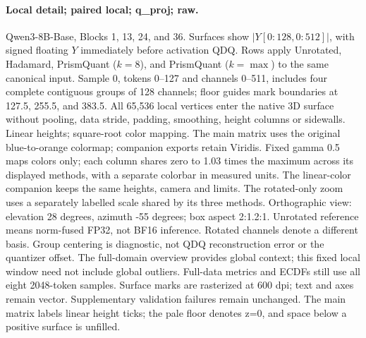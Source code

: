 \paragraph{Local detail; paired local; q\_proj; raw.} Qwen3-8B-Base, Blocks 1, 13, 24, and 36. Surfaces show $|Y[0:128,0:512]|$, with signed floating $Y$ immediately before activation QDQ. Rows apply Unrotated, Hadamard, PrismQuant ($k=8$), and PrismQuant ($k=\max$) to the same canonical input. Sample 0, tokens 0--127 and channels 0--511, includes four complete contiguous groups of 128 channels; floor guides mark boundaries at 127.5, 255.5, and 383.5. All 65,536 local vertices enter the native 3D surface without pooling, data stride, padding, smoothing, height columns or sidewalls. Linear heights; square-root color mapping. The main matrix uses the original blue-to-orange colormap; companion exports retain Viridis. Fixed gamma 0.5 maps colors only; each column shares zero to 1.03 times the maximum across its displayed methods, with a separate colorbar in measured units. The linear-color companion keeps the same heights, camera and limits. The rotated-only zoom uses a separately labelled scale shared by its three methods. Orthographic view: elevation 28 degrees, azimuth -55 degrees; box aspect 2:1.2:1. Unrotated reference means norm-fused FP32, not BF16 inference. Rotated channels denote a different basis. Group centering is diagnostic, not QDQ reconstruction error or the quantizer offset. The full-domain overview provides global context; this fixed local window need not include global outliers. Full-data metrics and ECDFs still use all eight 2048-token samples. Surface marks are rasterized at 600 dpi; text and axes remain vector. Supplementary validation failures remain unchanged. The main matrix labels linear height ticks; the pale floor denotes z=0, and space below a positive surface is unfilled.

